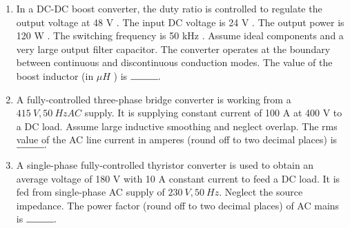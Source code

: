 \documentclass[journal]{IEEEtran}
\begin{document}
\begin{enumerate}
  \item In a DC-DC boost converter, the duty ratio is controlled to regulate the output voltage at 48 V . The input DC voltage is 24 V . The output power is 120 W . The switching frequency is 50 kHz . Assume ideal components and a very large output filter capacitor. The converter operates at the boundary between continuous and discontinuous conduction modes. The value of the boost inductor (in $\mu {H}$ ) is $\rule{1cm}{0.15mm} . $ 
  \hfill{}

  \item A fully-controlled three-phase bridge converter is working from a $415 {~V}, 50 {~Hz} {AC}$ supply. It is supplying constant current of 100 A at 400 V to a DC load. Assume large inductive smoothing and neglect overlap. The rms value of the AC line current in amperes (round off to two decimal places) is $\rule{1cm}{0.15mm} . $ 
  \hfill{}
  
  
  

\item A single-phase fully-controlled thyristor converter is used to obtain an average voltage of 180 V with 10 A constant current to feed a DC load. It is fed from single-phase AC supply of $230 {~V}, 50 {~Hz}$. Neglect the source impedance. The power factor (round off to two decimal places) of AC mains is $\rule{1cm}{0.15mm} . $ 
\hfill{}


\end{enumerate}
\end{document}
